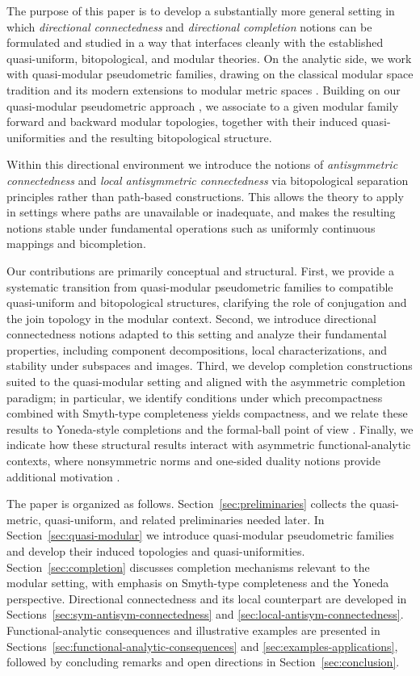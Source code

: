 \documentclass[preprint,12pt]{elsarticle}
\begin{document}
\medskip

The purpose of this paper is to develop a substantially more general
setting in which \emph{directional connectedness} and
\emph{directional completion} notions can be formulated and studied in a
way that interfaces cleanly with the established quasi-uniform,
bitopological, and modular theories.
On the analytic side, we work with quasi-modular pseudometric families,
drawing on the classical modular space tradition and its modern
extensions to modular metric spaces
\cite{Chistyakov2015,MushaandjaOlela2025,Musielak1983}.
Building on our quasi-modular pseudometric approach \cite{Majozi2025},
we associate to a given modular family forward and backward modular
topologies, together with their induced quasi-uniformities and the
resulting bitopological structure.

Within this directional environment we introduce the notions of
\emph{antisymmetric connectedness} and \emph{local antisymmetric
connectedness} via bitopological separation principles rather than
path-based constructions.
This allows the theory to apply in settings where paths are unavailable
or inadequate, and makes the resulting notions stable under fundamental
operations such as uniformly continuous mappings and bicompletion.

Our contributions are primarily conceptual and structural.
First, we provide a systematic transition from quasi-modular pseudometric
families to compatible quasi-uniform and bitopological structures,
clarifying the role of conjugation and the join topology in the modular
context.
Second, we introduce directional connectedness notions adapted to this
setting and analyze their fundamental properties, including component
decompositions, local characterizations, and stability under subspaces
and images.
Third, we develop completion constructions suited to the quasi-modular
setting and aligned with the asymmetric completion paradigm; in
particular, we identify conditions under which precompactness combined
with Smyth-type completeness yields compactness, and we relate these
results to Yoneda-style completions and the formal-ball point of view
\cite{Kunzi2001,KunziSchellekens2002,Rutten1998}.
Finally, we indicate how these structural results interact with
asymmetric functional-analytic contexts, where nonsymmetric norms and
one-sided duality notions provide additional motivation
\cite{Cobzas2013,CobzasSurvey}.

The paper is organized as follows.
Section~\ref{sec:preliminaries} collects the quasi-metric,
quasi-uniform, and related preliminaries needed later.
In Section~\ref{sec:quasi-modular} we introduce quasi-modular
pseudometric families and develop their induced topologies and
quasi-uniformities.
Section~\ref{sec:completion} discusses completion mechanisms relevant to
the modular setting, with emphasis on Smyth-type completeness and the
Yoneda perspective.
Directional connectedness and its local counterpart are developed in
Sections~\ref{sec:sym-antisym-connectedness} and
\ref{sec:local-antisym-connectedness}.
Functional-analytic consequences and illustrative examples are
presented in Sections~\ref{sec:functional-analytic-consequences} and
\ref{sec:examples-applications}, followed by concluding remarks and open
directions in Section~\ref{sec:conclusion}.
\end{document}
